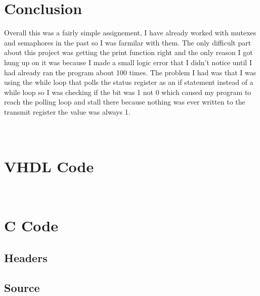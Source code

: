 \documentclass[10pt,a4paper]{article}
\begin{document}
	\section{Conclusion}
	Overall this was a fairly simple assignement, I have already worked with mutexes and semaphores in the past so I was farmilar with them. The only difficult part about this project was getting the print function right and the only reason I got hung up on it was because I made a small logic error that I didn't notice until I had already ran the program about 100 times. The problem I had was that I was using the while loop that polls the status register as an if statement instead of a while loop so I was checking if the bit was 1 not 0 which caused my program to reach the polling loop and stall there because nothing was ever written to the transmit register the value was always 1.
	\clearpage
	\appendix
	\section{\\VHDL Code}
	
	
	\section{\\C Code}
	\subsection{Headers}
	
	
	\subsection{Source}
	
\end{document}
